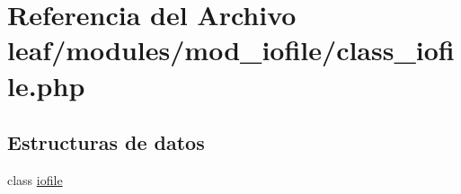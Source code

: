 \hypertarget{class__iofile_8php}{\section{Referencia del Archivo leaf/modules/mod\-\_\-iofile/class\-\_\-iofile.php}
\label{class__iofile_8php}
}
\subsection*{Estructuras de datos}
\begin{DoxyCompactItemize}
\item 
class \hyperlink{classiofile}{iofile}
\end{DoxyCompactItemize}
